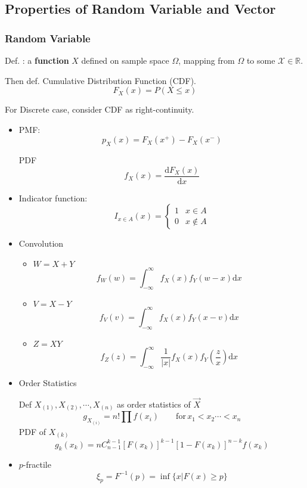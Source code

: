 \subsection{Properties of Random Variable and Vector}

\subsubsection{Random Variable}
    Def. : a \textbf{function} $X$ defined on sample space $\Omega$, mapping from $\Omega$ to some $\mathscr{X}\in\mathbb{R} $.

    Then def. Cumulative Distribution Function (CDF).
    \[
        F_X(x)=P(X\leq x)
    \]

    For Discrete case, consider CDF as right-continuity.

    \begin{itemize}
        \item

        \begin{center}
            \parbox[t]{8.65cm}{PMF:\[p_X(x)=F_X(x^+)-F_X(x^-)\]}
            \parbox[t]{8.65cm}{PDF
            \[
                f_X(x)=\frac{\mathrm{d}F_X(x)}{\mathrm{d}x}
            \]}
        \end{center}
        
        
        
        \item Indicator function:
        \[
            I_{x\in A}(x)=\begin{cases}
                1& x\in  A\\
                0& x\notin A
            \end{cases}
        \]
        \item Convolution
        \begin{itemize}
            \item $W=X+Y$
            \[
                f_W(w)=\int_{-\infty}^\infty f_X(x)f_Y(w-x)\mathrm{d}x    
            \]
            \item $V=X-Y$
            \[
                f_V(v)=\int_{-\infty}^\infty f_X(x)f_Y(x-v)\mathrm{d}x    
            \]
            \item $Z=XY$
            \[
                f_Z(z)=\int_{-\infty}^\infty \frac{1}{|x|}f_X(x)f_Y(\frac{z}{x})\mathrm{d}x
            \]
        \end{itemize}
        
        \item Order Statistics
        
        Def $X_{(1)},X_{(2)},\cdots,X_{(n)}$ as order statistics of $\vec{X}$
        \[
            g_{X_{(i)}}=n!\prod f(x_i)\qquad \mathrm{for}\, x_1<x_2\cdots <x_n    
        \]
        PDF of $X_{(k)}$
        \[
            g_k(x_k)=nC_{n-1}^{k-1}[F(x_k)]^{k-1}[1-F(x_k)]^{n-k}f(x_k)
        \]
        \item $p$-fractile
        \[\xi_p=F^{-1}(p)=\inf\{x|F(x)\geq p\}\]
    \end{itemize}







